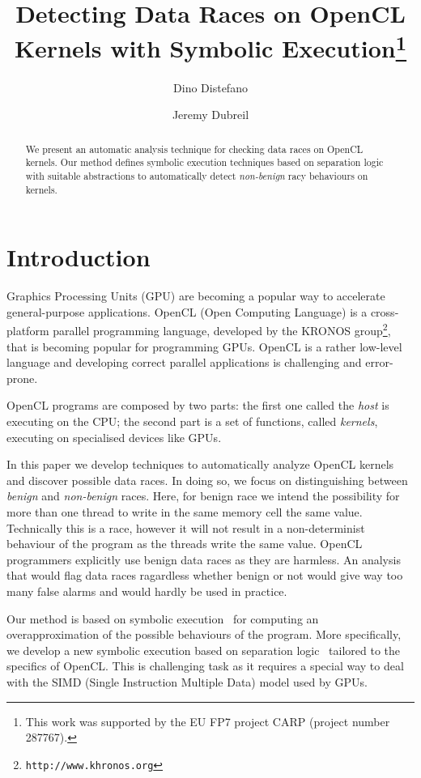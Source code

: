 \documentclass[a4paper,11pt]{llncs}
\title{Detecting Data Races on OpenCL Kernels with Symbolic Execution\thanks{This work was supported by the EU FP7 project CARP (project number 287767).}}
\author{Dino Distefano \and Jeremy Dubreil}
\institute{Monoidics Ltd}
\date{}
\newcounter{note_number}
\begin{document}
\maketitle


\begin{abstract}
We present an automatic analysis technique for checking data races on OpenCL kernels. 
Our method defines symbolic execution techniques based on separation logic with suitable abstractions to automatically detect {\em non-benign} racy behaviours on kernels.

\end{abstract}

\section{Introduction}
Graphics Processing Units (GPU) are becoming a popular way to accelerate general-purpose applications.
OpenCL (Open Computing Language) is a cross-platform parallel programming language, developed by the KRONOS group\footnote{\tt http://www.khronos.org}, that is becoming popular for programming GPUs.
OpenCL is a rather low-level language and developing correct parallel applications is challenging and error-prone.


OpenCL programs are composed by two parts: the first one 
called the \textit{host} is
executing on the CPU;  the second part  is a set of functions, called \textit{kernels}, executing on specialised devices like GPUs.

In this paper we develop techniques to automatically analyze OpenCL kernels and discover possible  data races.
In doing so, we focus on distinguishing between {\em benign} and {\em non-benign} races. 
Here, for benign race we intend the possibility for more than one thread to write in the same memory cell the same value. Technically this is a race, however 
it will not result in a non-determinist behaviour of the program as 
the threads write the same value. 
OpenCL programmers explicitly use benign data races as they are harmless. 
An analysis that would flag data races ragardless whether benign or not would give way too many false alarms and would hardly be used in practice.
  
Our method is based on symbolic execution~\cite{BCO05} for computing an overapproximation of the possible behaviours of the program.
More specifically, we develop a new symbolic execution based on separation logic~\cite{REYNOLDS02} tailored to the specifics of OpenCL.
This is challenging task as it requires a special way to deal with the SIMD (Single Instruction Multiple Data) model used by GPUs.
\end{document}
